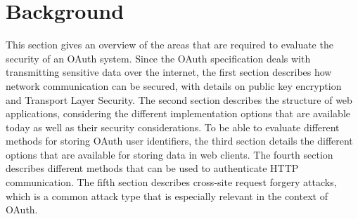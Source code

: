 \clearpage

\section{Background}
\label{sec:background}

This section gives an overview of the areas that are required to evaluate the security of an OAuth system.
Since the OAuth specification deals with transmitting sensitive data over the internet, the first section describes how network communication can be secured, with details on public key encryption and Transport Layer Security.
The second section describes the structure of web applications, considering the different implementation options that are available today as well as their security considerations.
To be able to evaluate different methods for storing OAuth user identifiers, the third section details the different options that are available for storing data in web clients.
The fourth section describes different methods that can be used to authenticate HTTP communication.
The fifth section describes cross-site request forgery attacks, which is a common attack type that is especially relevant in the context of OAuth.








